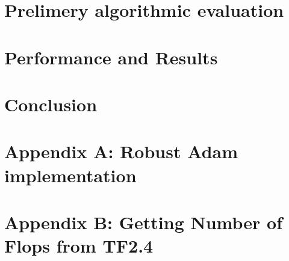 \documentclass[journal]{IEEEtranTIE}
\begin{document}
\section{Prelimery algorithmic evaluation} \label{sec:Body}
% 
%     
%     
%     
%         
%         
%         
\section{Performance and Results}\label{sec:results}

% 
% 
\section{Conclusion} \label{sec:conclussion}





%
%
{
\clearpage
\appendices
\section{Appendix A: Robust Adam implementation}  \label{app:RoAdam}

\clearpage
\section{Appendix B: Getting Number of Flops from TF2.4}  \label{app:flops}

}
{}
\end{document}
